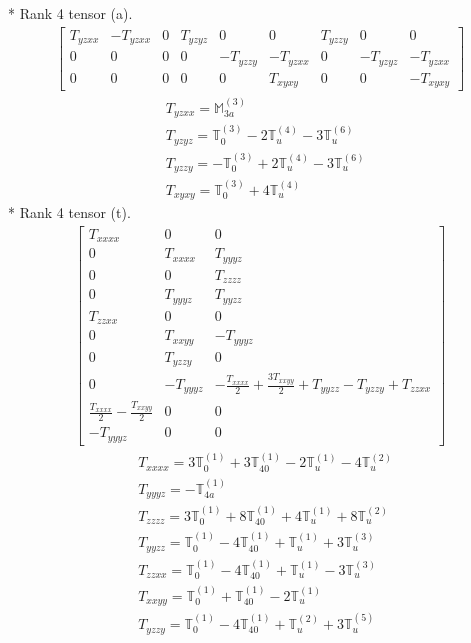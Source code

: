 \documentclass[fleqn,8pt,landscape]{jsarticle}
\begin{document}
* Rank 4 tensor (a).
\begin{align*}
\begin{bmatrix} T_{yzxx} & - T_{yzxx} & 0 & T_{yzyz} & 0 & 0 & T_{yzzy} & 0 & 0 \\ 0 & 0 & 0 & 0 & - T_{yzzy} & - T_{yzxx} & 0 & - T_{yzyz} & - T_{yzxx} \\ 0 & 0 & 0 & 0 & 0 & T_{xyxy} & 0 & 0 & - T_{xyxy} \end{bmatrix}
\end{align*}
\begin{align*}
& T_{yzxx} = \mathbb{M}_{3a}^{(3)} \\
& T_{yzyz} = \mathbb{T}_{0}^{(3)} - 2 \mathbb{T}_{u}^{(4)} - 3 \mathbb{T}_{u}^{(6)} \\
& T_{yzzy} = - \mathbb{T}_{0}^{(3)} + 2 \mathbb{T}_{u}^{(4)} - 3 \mathbb{T}_{u}^{(6)} \\
& T_{xyxy} = \mathbb{T}_{0}^{(3)} + 4 \mathbb{T}_{u}^{(4)}
\end{align*}
* Rank 4 tensor (t).
\begin{align*}
\begin{bmatrix} T_{xxxx} & 0 & 0 \\ 0 & T_{xxxx} & T_{yyyz} \\ 0 & 0 & T_{zzzz} \\ 0 & T_{yyyz} & T_{yyzz} \\ T_{zzxx} & 0 & 0 \\ 0 & T_{xxyy} & - T_{yyyz} \\ 0 & T_{yzzy} & 0 \\ 0 & - T_{yyyz} & - \frac{T_{xxxx}}{2} + \frac{3 T_{xxyy}}{2} + T_{yyzz} - T_{yzzy} + T_{zzxx} \\ \frac{T_{xxxx}}{2} - \frac{T_{xxyy}}{2} & 0 & 0 \\ - T_{yyyz} & 0 & 0 \end{bmatrix}
\end{align*}
\begin{align*}
& T_{xxxx} = 3 \mathbb{T}_{0}^{(1)} + 3 \mathbb{T}_{40}^{(1)} - 2 \mathbb{T}_{u}^{(1)} - 4 \mathbb{T}_{u}^{(2)} \\
& T_{yyyz} = - \mathbb{T}_{4a}^{(1)} \\
& T_{zzzz} = 3 \mathbb{T}_{0}^{(1)} + 8 \mathbb{T}_{40}^{(1)} + 4 \mathbb{T}_{u}^{(1)} + 8 \mathbb{T}_{u}^{(2)} \\
& T_{yyzz} = \mathbb{T}_{0}^{(1)} - 4 \mathbb{T}_{40}^{(1)} + \mathbb{T}_{u}^{(1)} + 3 \mathbb{T}_{u}^{(3)} \\
& T_{zzxx} = \mathbb{T}_{0}^{(1)} - 4 \mathbb{T}_{40}^{(1)} + \mathbb{T}_{u}^{(1)} - 3 \mathbb{T}_{u}^{(3)} \\
& T_{xxyy} = \mathbb{T}_{0}^{(1)} + \mathbb{T}_{40}^{(1)} - 2 \mathbb{T}_{u}^{(1)} \\
& T_{yzzy} = \mathbb{T}_{0}^{(1)} - 4 \mathbb{T}_{40}^{(1)} + \mathbb{T}_{u}^{(2)} + 3 \mathbb{T}_{u}^{(5)}
\end{align*}
\end{document}
